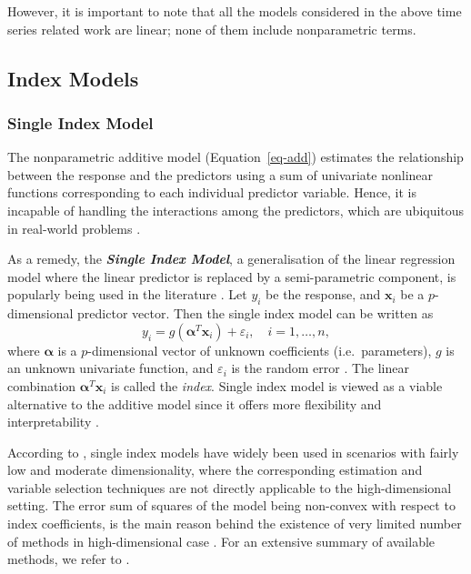 \documentclass[
  11pt,
  a4paper,
]{article}
\begin{document}
However, it is important to note that all the models considered in the
above time series related work are linear; none of them include
nonparametric terms.

\subsection{Index Models}\label{sec-Index}

\subsubsection{Single Index Model}\label{single-index-model}

The nonparametric additive model (Equation~\ref{eq-add}) estimates the
relationship between the response and the predictors using a sum of
univariate nonlinear functions corresponding to each individual
predictor variable. Hence, it is incapable of handling the interactions
among the predictors, which are ubiquitous in real-world problems
\autocite{Zhang2008}.

As a remedy, the \textbf{\emph{Single Index Model}}, a generalisation of
the linear regression model where the linear predictor is replaced by a
semi-parametric component, is popularly being used in the literature
\autocite{Radchenko2015}. Let \(y_{i}\) be the response, and
\(\bm{x}_{i}\) be a \(p\)-dimensional predictor vector. Then the single
index model can be written as \[
  y_{i} = g \left ( \bm{\alpha}^{T} \bm{x}_{i} \right ) + \varepsilon_{i}, \quad i = 1, \dots, n,
\] where \(\bm{\alpha}\) is a \(p\)-dimensional vector of unknown
coefficients (i.e.~parameters), \(g\) is an unknown univariate function,
and \(\varepsilon_{i}\) is the random error
\autocite{Stoker1986,Hardle1993}. The linear combination
\(\bm{\alpha}^{T} \bm{x}_{i}\) is called the \emph{index}. Single index
model is viewed as a viable alternative to the additive model since it
offers more flexibility and interpretability \autocite{Radchenko2015}.

According to \textcite{Radchenko2015}, single index models have widely
been used in scenarios with fairly low and moderate dimensionality,
where the corresponding estimation and variable selection techniques are
not directly applicable to the high-dimensional setting. The error sum
of squares of the model being non-convex with respect to index
coefficients, is the main reason behind the existence of very limited
number of methods in high-dimensional case \autocite{Radchenko2015}. For
an extensive summary of available methods, we refer to
\textcite{Radchenko2015}.
\end{document}
